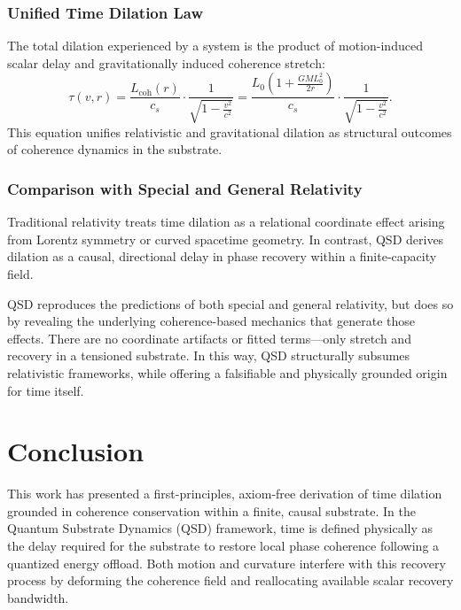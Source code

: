 \documentclass[entropy,article,submit,pdftex,moreauthors]{Definitions/mdpi}
\begin{document}
\subsubsection{Unified Time Dilation Law}

The total dilation experienced by a system is the product of motion-induced scalar delay and gravitationally induced coherence stretch:
\begin{equation}
\tau(v, r) = \frac{L_{\text{coh}}(r)}{c_s} \cdot \frac{1}{\sqrt{1 - \frac{v^2}{c^2}}}
= \frac{L_0 \left(1 + \frac{GM L_0^2}{2r}\right)}{c_s} \cdot \frac{1}{\sqrt{1 - \frac{v^2}{c^2}}}.
\end{equation}
This equation unifies relativistic and gravitational dilation as structural outcomes of coherence dynamics in the substrate.

\subsubsection{Comparison with Special and General Relativity}

Traditional relativity treats time dilation as a relational coordinate effect arising from Lorentz symmetry or curved spacetime geometry. In contrast, QSD derives dilation as a causal, directional delay in phase recovery within a finite-capacity field.

QSD reproduces the predictions of both special and general relativity, but does so by revealing the underlying coherence-based mechanics that generate those effects. There are no coordinate artifacts or fitted terms—only stretch and recovery in a tensioned substrate. In this way, QSD structurally subsumes relativistic frameworks, while offering a falsifiable and physically grounded origin for time itself.

\section{Conclusion}

This work has presented a first-principles, axiom-free derivation of time dilation grounded in coherence conservation within a finite, causal substrate. In the Quantum Substrate Dynamics (QSD) framework, time is defined physically as the delay required for the substrate to restore local phase coherence following a quantized energy offload. Both motion and curvature interfere with this recovery process by deforming the coherence field and reallocating available scalar recovery bandwidth.
\end{document}

